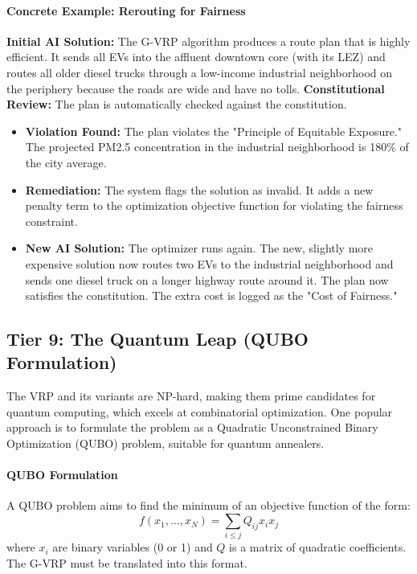 \documentclass{article}
\begin{document}
\begin{enumerate}
\paragraph{Concrete Example: Rerouting for Fairness}
\textbf{Initial AI Solution:} The G-VRP algorithm produces a route plan that is highly efficient. It sends all EVs into the affluent downtown core (with its LEZ) and routes all older diesel trucks through a low-income industrial neighborhood on the periphery because the roads are wide and have no tolls.
\textbf{Constitutional Review:} The plan is automatically checked against the constitution.
\begin{itemize}
    \item \textbf{Violation Found:} The plan violates the "Principle of Equitable Exposure." The projected PM2.5 concentration in the industrial neighborhood is 180\% of the city average.
    \item \textbf{Remediation:} The system flags the solution as invalid. It adds a new penalty term to the optimization objective function for violating the fairness constraint.
    \item \textbf{New AI Solution:} The optimizer runs again. The new, slightly more expensive solution now routes two EVs to the industrial neighborhood and sends one diesel truck on a longer highway route around it. The plan now satisfies the constitution. The extra cost is logged as the "Cost of Fairness."
\end{itemize}

\subsection{Tier 9: The Quantum Leap (QUBO Formulation)}
The VRP and its variants are NP-hard, making them prime candidates for quantum computing, which excels at combinatorial optimization. One popular approach is to formulate the problem as a Quadratic Unconstrained Binary Optimization (QUBO) problem, suitable for quantum annealers.

\paragraph{QUBO Formulation}
A QUBO problem aims to find the minimum of an objective function of the form:
\begin{equation}
    f(x_1,...,x_N) = \sum_{i \leq j} Q_{ij} x_i x_j
\end{equation}
where $x_i$ are binary variables (0 or 1) and $Q$ is a matrix of quadratic coefficients. The G-VRP must be translated into this format.


\end{enumerate}
\end{document}
